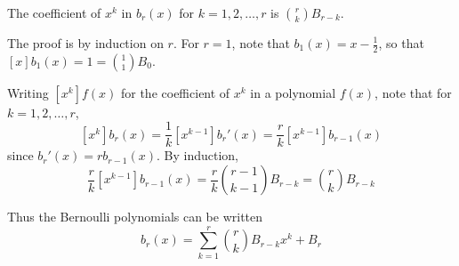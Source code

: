 \documentclass[12pt]{article}
\begin{document}
The coefficient of $x^k$ in $b_r(x)$ for $k=1,2,\ldots,r$ is $\binom{r}{k}B_{r-k}$.

The proof is by induction on $r$. For $r=1$, note that $b_1(x)=x-\frac{1}{2}$, so that $[x]b_1(x)=1=\binom{1}{1}B_0$.

Writing $[x^k]f(x)$ for the coefficient of $x^k$ in a polynomial $f(x)$, note that for $k=1,2,\ldots,r$,
\[[x^k]b_r(x)=\frac{1}{k}[x^{k-1}]b_r'(x)=\frac{r}{k}[x^{k-1}]b_{r-1}(x)\]
since $b_r'(x)=rb_{r-1}(x)$. By induction,
\[\frac{r}{k}[x^{k-1}]b_{r-1}(x)=\frac{r}{k}\binom{r-1}{k-1}B_{r-k}=\binom{r}{k}B_{r-k}\]

Thus the Bernoulli polynomials can be written
\[b_r(x) = \sum_{k=1}^r \binom{r}{k}B_{r-k}x^k + B_r\]
\end{document}

